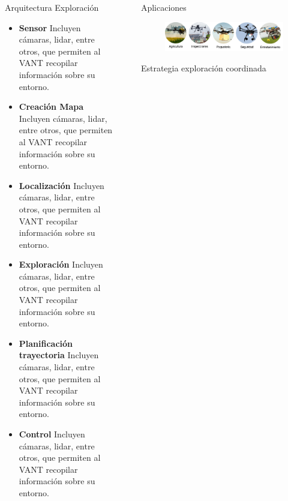 \documentclass[final]{beamer}
\newlength{\sepwidth}
\newlength{\colwidth}
\newcommand{\separatorcolumn}{\begin{column}{\sepwidth}\end{column}}
\begin{document}
\begin{frame}[t]
\begin{columns}[t]
\begin{column}{\colwidth}
\begin{block}{\color{teal}Arquitectura Exploración}
    \begin{itemize}
    \item \textbf{Sensor} Incluyen cámaras, lidar, entre otros, que permiten al VANT recopilar información sobre su entorno.
    \item \textbf{Creación Mapa} Incluyen cámaras, lidar, entre otros, que permiten al VANT recopilar información sobre su entorno.
    \item \textbf{Localización} Incluyen cámaras, lidar, entre otros, que permiten al VANT recopilar información sobre su entorno.
    \item \textbf{Exploración} Incluyen cámaras, lidar, entre otros, que permiten al VANT recopilar información sobre su entorno.
    \item \textbf{Planificación trayectoria} Incluyen cámaras, lidar, entre otros, que permiten al VANT recopilar información sobre su entorno.
    \item \textbf{Control} Incluyen cámaras, lidar, entre otros, que permiten al VANT recopilar información sobre su entorno.
    \end{itemize}
  \end{block}
\end{column}

\separatorcolumn

\begin{column}{\colwidth}
  
  \begin{block}{\color{teal}Aplicaciones}

    \begin{figure}
      \centering
      \includegraphics[width=30cm]{images/ap_dr.png}
      \end{figure}
  \end{block}

  \begin{block}{\color{teal}Estrategia exploración coordinada}


\end{block}
\end{column}
\end{columns}
\end{frame}
\end{document}
